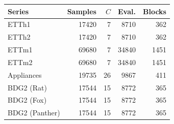 \begingroup\fontsize{9}{11}\selectfont
\setlength{\tabcolsep}{2.3pt}
\begin{tabular}{lrrrr}
\toprule
Series & Samples & $C$ & Eval. & Blocks \\
\midrule
ETTh1 & 17420 & 7 & 8710 & 362 \\
ETTh2 & 17420 & 7 & 8710 & 362 \\
ETTm1 & 69680 & 7 & 34840 & 1451 \\
ETTm2 & 69680 & 7 & 34840 & 1451 \\
Appliances & 19735 & 26 & 9867 & 411 \\
BDG2 (Rat) & 17544 & 15 & 8772 & 365 \\
BDG2 (Fox) & 17544 & 15 & 8772 & 365 \\
BDG2 (Panther) & 17544 & 15 & 8772 & 365 \\
\bottomrule
\end{tabular}
\endgroup
